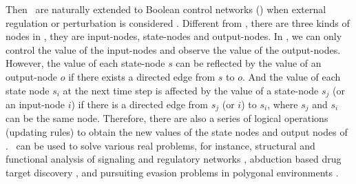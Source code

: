 Then \BNs\ are naturally extended to Boolean control networks (\BCNs) when external regulation or perturbation is considered \cite{Ideker2001A}. Different from \BNs, there are three kinds of nodes in \BCNs, they are input-nodes, state-nodes and output-nodes. In \BCNs, we can only control the value of the input-nodes and observe the value of the output-nodes. However, the value of each state-node $s$ can be reflected by the value of an output-node $o$ if there exists a directed edge from $s$ to $o$. And the value of each state node $s_i$ at the next time step is affected by the value of a state-node $s_j$ (or an input-node $i$) if there is a directed edge from $s_j$ (or $i$) to $s_i$, where $s_j$ and $s_i$ can be the same node. Therefore, there are also a series of logical operations (updating rules) to obtain the new values of the state nodes and output nodes of \BCNs. \BCNs\ can be used to solve various real problems, for instance, %
structural and functional analysis of signaling and regulatory networks \cite{Kaufman1999A, Klamt2006A}, 
abduction based drug target discovery \cite{Biane2017Abduction}, %
and pursuiting evasion problems in polygonal environments \cite{Thunberg2011A}. %
